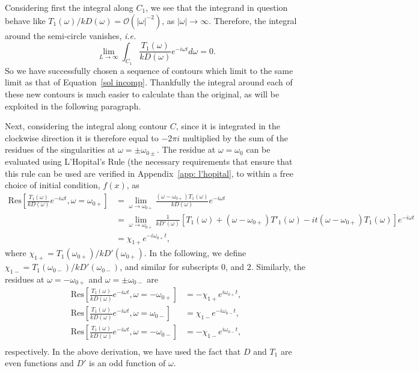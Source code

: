 \documentclass{aastex61}
\begin{document}
Considering first the integral along $C_1$, we see that the integrand in question behave like $T_1(\omega)/kD(\omega) = \mathcal{O}(|\omega|^{-2})$, as $|\omega| \to \infty$. Therefore, the integral around the semi-circle vanishes, \textit{i.e.}
\begin{equation}
\lim_{L \to \infty} \int_{C_1} \frac{T_1(\omega)}{kD(\omega)} e^{-i\omega t} d\omega = 0.
\end{equation}
So we have successfully chosen a sequence of contours which limit to the same limit as that of Equation~\eqref{sol incomp}. Thankfully the integral around each of these new contours is much easier to calculate than the original, as will be exploited in the following paragraph.

Next, considering the integral along contour $C$, since it is integrated in the clockwise direction it is therefore equal to $-2\pi i$ multiplied by the sum of the residues of the singularities at $\omega = \pm \omega_{0\pm}$. The residue at $\omega = \omega_0$ can be evaluated using L'Hopital's Rule (the necessary requirements that ensure that this rule can be used are verified in Appendix~\ref{app: l'hopital}, to within a free choice of initial condition, $f(x)$, as
\begin{align}
\mathrm{Res}\left[\frac{T_1(\omega)}{kD(\omega)}e^{-i\omega t}, \omega = \omega_{0+} \right] &= 
\lim_{\omega \to \omega_{0+}} \frac{(\omega - \omega_{0+})T_1(\omega)}{kD(\omega)} e^{-i\omega t} \\ 
&= \lim_{\omega \to \omega_{0+}} \frac{1}{kD'(\omega)} [T_1(\omega) + (\omega - \omega_{0+})T'_1(\omega) - it(\omega - \omega_{0+})T_1(\omega)]e^{-i\omega t} \\
&= \chi_{1+} e^{-i\omega_{0+} t},
\end{align}
where $\chi_{1+} = T_1(\omega_{0+}) / kD'(\omega_{0+})$. In the following, we define $\chi_{1-} = T_1(\omega_{0-}) / kD'(\omega_{0-})$, and similar for subscripts $0$, and $2$. Similarly, the residues at $\omega = -\omega_{0+}$ and $\omega = \pm\omega_{0-}$ are
\begin{align}
\mathrm{Res}\left[\frac{T_1(\omega)}{kD(\omega)}e^{-i\omega t}, \omega = -\omega_{0+} \right] &= -\chi_{1+} e^{i\omega_{0+} t}, \\
\mathrm{Res}\left[\frac{T_1(\omega)}{kD(\omega)}e^{-i\omega t}, \omega = \omega_{0-} \right] &= \chi_{1-} e^{-i\omega_{0-} t}, \\
\mathrm{Res}\left[\frac{T_1(\omega)}{kD(\omega)}e^{-i\omega t}, \omega = -\omega_{0-} \right] &= -\chi_{1-} e^{i\omega_{0-} t}, \\
\end{align}
respectively. In the above derivation, we have used the fact that $D$ and $T_1$ are even functions and $D'$ is an odd function of $\omega$.
\end{document}
